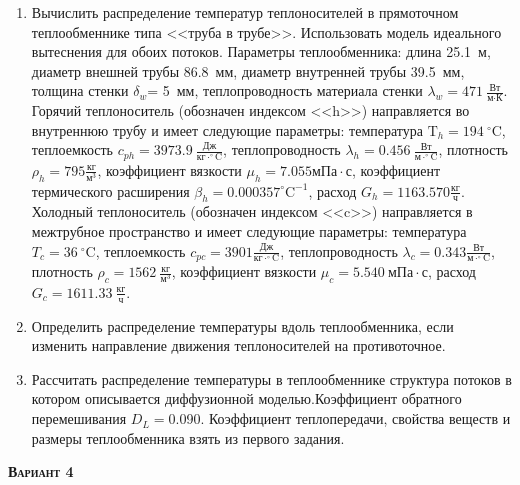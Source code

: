 \begin{enumerate} 
\item Вычислить распределение температур теплоносителей в прямоточном теплообменнике типа <<труба в трубе>>. Использовать модель идеального вытеснения для обоих потоков. Параметры теплообменника: длина  25.1~м, диаметр внешней трубы 86.8~мм,  диаметр внутренней трубы 39.5~мм, толщина стенки $\delta_{w}$=     5~мм,  теплопроводность материала стенки $\lambda_{w}=  471~\frac{\text{Вт}}{\text{м} \cdot \text{К}}$.  Горячий теплоноситель (обозначен индексом <<h>>) направляется во внутреннюю трубу и	 имеет следующие параметры: температура $\text{T}_{h}= 194~^\circ\mathrm{C}$, теплоемкость	  $c_{p{h}}= 3973.9~\frac{\text{Дж}}{\text{кг} \cdot ^\circ\mathrm{C}}$, теплопроводность 		$\lambda_{h}= 0.456~\frac{\text{Вт}}{\text{м} \cdot ^\circ\mathrm{C}}$, плотность 		$\rho_{h}=  795 \frac{\text{кг}}{\text{м}^3}$, коэффициент вязкости $\mu_{h}=7.055 \text{мПа} 		\cdot \text{с} $, коэффициент термического расширения $\beta_{h}=0.000357 ^\circ\mathrm{C}^{-1}$,		 расход $G_{h}= 1163.570 \frac{\text{кг}}{\text{ч}}$. Холодный теплоноситель (обозначен индексом <<c>>) 		 направляется в межтрубное пространство и имеет следующие параметры: температура $T_{c}=   36		 ~^\circ\mathrm{C}$, теплоемкость $c_{p{c}}= 3901 \frac{\text{Дж}}{\text{кг} \cdot ^\circ\mathrm{C}}$,			 теплопроводность $\lambda_{c}=0.343 \frac{\text{Вт}}{\text{м} \cdot ^\circ\mathrm{C}}$, плотность 			 $\rho_{c}=  1562~\frac{\text{кг}}{\text{м}^3}$, коэффициент вязкости $\mu_{c}=5.540~\text{мПа} \cdot \text{с} $, 			 расход $G_{c}=1611.33~\frac{\text{кг}}{\text{ч}}$. 

\item Определить распределение температуры вдоль теплообменника, если 	изменить направление движения теплоносителей на противоточное.

\item Рассчитать распределение температуры в теплообменнике структура потоков в котором описывается диффузионной моделью.Коэффициент обратного перемешивания $D_L = $0.090. Коэффициент теплопередачи, свойства веществ и размеры теплообменника взять из первого задания. 

\end{enumerate}

\textsc{\textbf{Вариант 4}}

